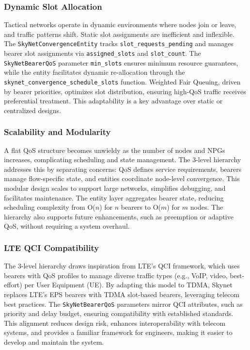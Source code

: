 \documentclass{article}
\begin{document}
\subsubsection{Dynamic Slot Allocation}
Tactical networks operate in dynamic environments where nodes join or leave,
and traffic patterns shift. Static slot assignments are inefficient and inflexible.
The \texttt{SkyNetConvergenceEntity} tracks \texttt{slot\_requests\_pending} and
manages bearer slot assignments via \texttt{assigned\_slots} and \texttt{slot\_count}.
The \texttt{SkyNetBearerQoS} parameter \texttt{min\_slots} ensures minimum resource
guarantees, while the entity facilitates dynamic re-allocation through
the \texttt{skynet\_convergence\_schedule\_slots} function.
Weighted Fair Queuing, driven by bearer priorities, optimizes slot distribution,
ensuring high-QoS traffic receives preferential treatment.
This adaptability is a key advantage over static or centralized designs.

\subsubsection{Scalability and Modularity}
A flat QoS structure becomes unwieldy as the number of nodes and NPGs increases,
complicating scheduling and state management. The 3-level hierarchy addresses this
by separating concerns: QoS defines service requirements, bearers manage
flow-specific state, and entities coordinate node-level convergence.
This modular design scales to support large networks, simplifies debugging,
and facilitates maintenance. The entity layer aggregates bearer state, reducing
scheduling complexity from O($n$) for $n$ bearers to O($m$) for $m$ nodes.
The hierarchy also supports future enhancements, such as preemption or adaptive QoS,
without requiring a system overhaul.

\subsubsection{LTE QCI Compatibility}
The 3-level hierarchy draws inspiration from LTE's QCI framework,
which uses bearers with QoS profiles to manage diverse traffic
types (e.g., VoIP, video, best-effort) per User Equipment (UE).
By adapting this model to TDMA, Skynet replaces LTE's EPS bearers with
TDMA slot-based bearers, leveraging telecom best practices.
The \texttt{SkyNetBearerQoS} parameters mirror QCI attributes,
such as priority and delay budget, ensuring compatibility with established standards.
This alignment reduces design risk, enhances interoperability with telecom systems,
and provides a familiar framework for engineers, making it easier to develop and maintain the system.
\end{document}
